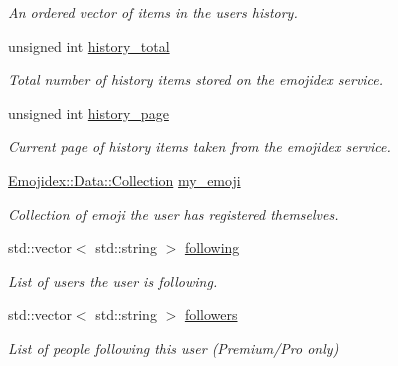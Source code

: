 \begin{DoxyCompactItemize}
\begin{DoxyCompactList}\small\item\em An ordered vector of items in the users history. \end{DoxyCompactList}\item 
unsigned int \hyperlink{classEmojidex_1_1Service_1_1User_a5a7b4e141fdf8a9aaddfcce3394b12db}{history\+\_\+total}\hypertarget{classEmojidex_1_1Service_1_1User_a5a7b4e141fdf8a9aaddfcce3394b12db}{}\label{classEmojidex_1_1Service_1_1User_a5a7b4e141fdf8a9aaddfcce3394b12db}

\begin{DoxyCompactList}\small\item\em Total number of history items stored on the emojidex service. \end{DoxyCompactList}\item 
unsigned int \hyperlink{classEmojidex_1_1Service_1_1User_ab938b61c56121dbf590aa08d96556cd0}{history\+\_\+page}\hypertarget{classEmojidex_1_1Service_1_1User_ab938b61c56121dbf590aa08d96556cd0}{}\label{classEmojidex_1_1Service_1_1User_ab938b61c56121dbf590aa08d96556cd0}

\begin{DoxyCompactList}\small\item\em Current page of history items taken from the emojidex service. \end{DoxyCompactList}\item 
\hyperlink{classEmojidex_1_1Data_1_1Collection}{Emojidex\+::\+Data\+::\+Collection} \hyperlink{classEmojidex_1_1Service_1_1User_aa4b1decc97e13a92ba6830ccf2176f09}{my\+\_\+emoji}\hypertarget{classEmojidex_1_1Service_1_1User_aa4b1decc97e13a92ba6830ccf2176f09}{}\label{classEmojidex_1_1Service_1_1User_aa4b1decc97e13a92ba6830ccf2176f09}

\begin{DoxyCompactList}\small\item\em Collection of emoji the user has registered themselves. \end{DoxyCompactList}\item 
std\+::vector$<$ std\+::string $>$ \hyperlink{classEmojidex_1_1Service_1_1User_a48fb02c42de30f7b901f41fd74117839}{following}\hypertarget{classEmojidex_1_1Service_1_1User_a48fb02c42de30f7b901f41fd74117839}{}\label{classEmojidex_1_1Service_1_1User_a48fb02c42de30f7b901f41fd74117839}

\begin{DoxyCompactList}\small\item\em List of users the user is following. \end{DoxyCompactList}\item 
std\+::vector$<$ std\+::string $>$ \hyperlink{classEmojidex_1_1Service_1_1User_a89bd503730e389734980d45c978c6612}{followers}\hypertarget{classEmojidex_1_1Service_1_1User_a89bd503730e389734980d45c978c6612}{}\label{classEmojidex_1_1Service_1_1User_a89bd503730e389734980d45c978c6612}

\begin{DoxyCompactList}\small\item\em List of people following this user (Premium/\+Pro only) \end{DoxyCompactList}\end{DoxyCompactItemize}
